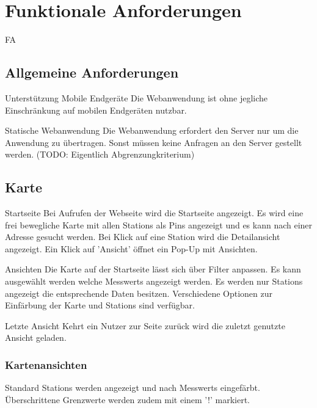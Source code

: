 \section{Funktionale Anforderungen}

\setcounter{counter}{10}
\begin{Kriterien}{FA}

\subsection{Allgemeine Anforderungen}

 \item[Unterstützung Mobile Endgeräte]
   Die Webanwendung ist ohne jegliche Einschränkung auf mobilen Endgeräten nutzbar.  

 \item[Statische Webanwendung]
   Die Webanwendung erfordert den Server nur um die Anwendung zu übertragen.
   Sonst müssen keine Anfragen an den Server gestellt werden. (TODO: Eigentlich Abgrenzungkriterium)

\subsection{Karte}

 \item[Startseite]
   Bei Aufrufen der Webseite wird die Startseite angezeigt.
   Es wird eine frei bewegliche Karte mit allen \glspl{Station} als \glspl{Pin} angezeigt und es kann nach einer Adresse gesucht werden.
   Bei Klick auf eine Station wird die Detailansicht angezeigt.
   Ein Klick auf 'Ansicht' öffnet ein \gls{Pop-Up} mit Ansichten.

 \item[Ansichten]
   Die Karte auf der Startseite lässt sich über Filter anpassen.
   Es kann ausgewählt werden welche \glspl{Messwert} angezeigt werden.
   Es werden nur \glspl{Station} angezeigt die entsprechende Daten besitzen.
   Verschiedene Optionen zur Einfärbung der Karte und \glspl{Station} sind verfügbar.

 \item[Letzte Ansicht]
  Kehrt ein Nutzer zur Seite zurück wird die zuletzt genutzte Ansicht geladen.

 \subsubsection{Kartenansichten}

 \item[Standard]
  \glspl{Station} werden angezeigt und nach \glspl{Messwert} eingefärbt. 
  Überschrittene Grenzwerte werden zudem mit einem '!' markiert.


\end{Kriterien}
